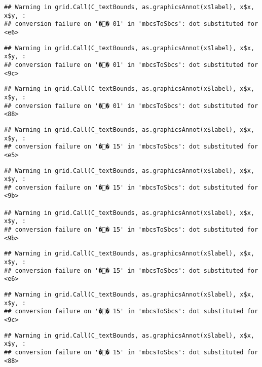 \documentclass[]{article}
\begin{document}
\begin{verbatim}
## Warning in grid.Call(C_textBounds, as.graphicsAnnot(x$label), x$x, x$y, :
## conversion failure on '�� 01' in 'mbcsToSbcs': dot substituted for <e6>
\end{verbatim}

\begin{verbatim}
## Warning in grid.Call(C_textBounds, as.graphicsAnnot(x$label), x$x, x$y, :
## conversion failure on '�� 01' in 'mbcsToSbcs': dot substituted for <9c>
\end{verbatim}

\begin{verbatim}
## Warning in grid.Call(C_textBounds, as.graphicsAnnot(x$label), x$x, x$y, :
## conversion failure on '�� 01' in 'mbcsToSbcs': dot substituted for <88>
\end{verbatim}

\begin{verbatim}
## Warning in grid.Call(C_textBounds, as.graphicsAnnot(x$label), x$x, x$y, :
## conversion failure on '�� 15' in 'mbcsToSbcs': dot substituted for <e5>
\end{verbatim}

\begin{verbatim}
## Warning in grid.Call(C_textBounds, as.graphicsAnnot(x$label), x$x, x$y, :
## conversion failure on '�� 15' in 'mbcsToSbcs': dot substituted for <9b>

## Warning in grid.Call(C_textBounds, as.graphicsAnnot(x$label), x$x, x$y, :
## conversion failure on '�� 15' in 'mbcsToSbcs': dot substituted for <9b>
\end{verbatim}

\begin{verbatim}
## Warning in grid.Call(C_textBounds, as.graphicsAnnot(x$label), x$x, x$y, :
## conversion failure on '�� 15' in 'mbcsToSbcs': dot substituted for <e6>
\end{verbatim}

\begin{verbatim}
## Warning in grid.Call(C_textBounds, as.graphicsAnnot(x$label), x$x, x$y, :
## conversion failure on '�� 15' in 'mbcsToSbcs': dot substituted for <9c>
\end{verbatim}

\begin{verbatim}
## Warning in grid.Call(C_textBounds, as.graphicsAnnot(x$label), x$x, x$y, :
## conversion failure on '�� 15' in 'mbcsToSbcs': dot substituted for <88>
\end{verbatim}
\end{document}
